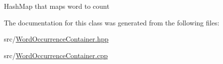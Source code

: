 Hash\+Map that maps word to count 

The documentation for this class was generated from the following files\+:\begin{DoxyCompactItemize}
\item 
src/\mbox{\hyperlink{_word_occurrence_container_8hpp}{Word\+Occurrence\+Container.\+hpp}}\item 
src/\mbox{\hyperlink{_word_occurrence_container_8cpp}{Word\+Occurrence\+Container.\+cpp}}\end{DoxyCompactItemize}
